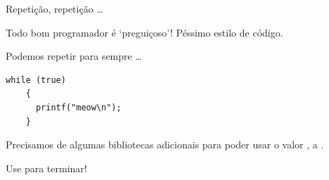 \documentclass{beamer}
\begin{document}
\begin{frame}{Repetição, repetição \ldots}

  Todo bom programador é `preguiçoso'! Péssimo estilo de código. \vspace{.5cm}

  

  \framebreak

  
    
  

  \framebreak

  Podemos repetir para sempre \ldots

  \begin{lstlisting}[style=normalc]
    while (true)
    {
      printf("meow\n");
    }
  \end{lstlisting}

  Precisamos de algumas bibliotecas adicionais para poder usar o valor
  , a .

  Use  para terminar!

  \framebreak

  
  
\end{frame}
\end{document}
